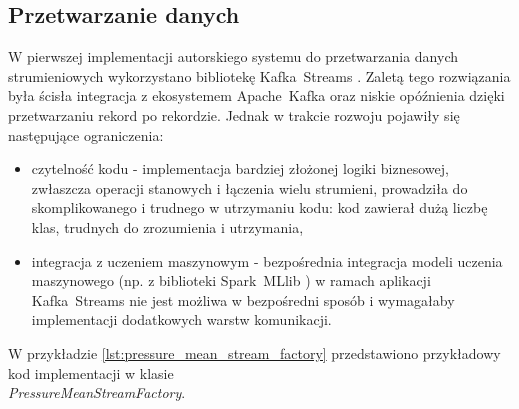 \subsection{Przetwarzanie danych}

W pierwszej implementacji autorskiego systemu do przetwarzania danych strumieniowych wykorzystano bibliotekę \mbox{Kafka Streams} \cite{kafka_streams}. Zaletą tego rozwiązania była ścisła integracja z ekosystemem \mbox{Apache Kafka} \cite{kafka} oraz niskie opóźnienia dzięki przetwarzaniu rekord po rekordzie. Jednak w trakcie rozwoju pojawiły się następujące ograniczenia:

\vspace{0.3em}

\begin{itemize}
    \item czytelność kodu - implementacja bardziej złożonej logiki biznesowej, zwłaszcza operacji stanowych i łączenia wielu strumieni, prowadziła do skomplikowanego i trudnego w utrzymaniu kodu: kod zawierał dużą liczbę klas, trudnych do zrozumienia i utrzymania,
    \item integracja z uczeniem maszynowym - bezpośrednia integracja modeli uczenia maszynowego (np. z biblioteki \mbox{Spark MLlib} \cite{spark_mllib_reference}) w ramach aplikacji \mbox{Kafka Streams} nie jest możliwa w bezpośredni sposób i wymagałaby implementacji dodatkowych warstw komunikacji.
\end{itemize}

\vspace{0.3em}

W przykładzie \ref{lst:pressure_mean_stream_factory} przedstawiono przykładowy kod implementacji w klasie \\ \mbox{\textit{PressureMeanStreamFactory}}.

\newpage

